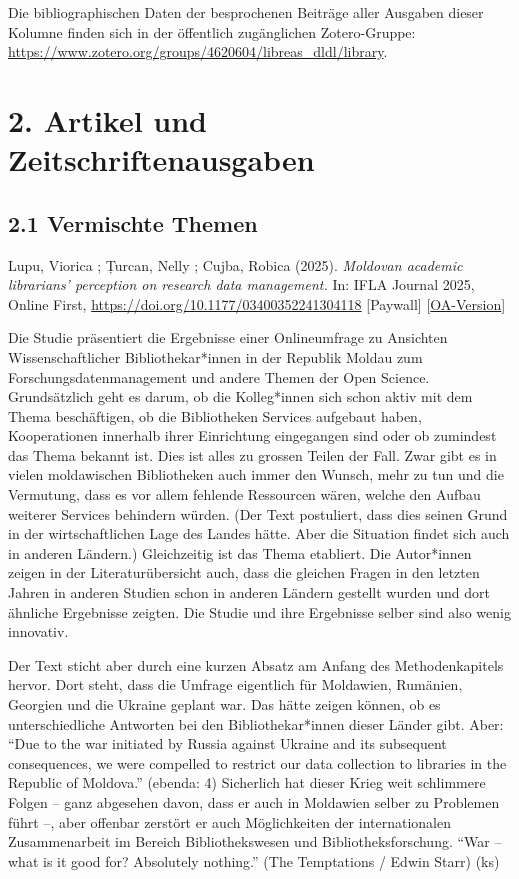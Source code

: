 \documentclass[a4paper,
fontsize=11pt,
oneside,
numbers=noperiodatend,
parskip=half-,
bibliography=totoc,
final
]{scrartcl}
\begin{document}
Die bibliographischen Daten der besprochenen Beiträge aller Ausgaben
dieser Kolumne finden sich in der öffentlich zugänglichen Zotero-Gruppe:
\url{https://www.zotero.org/groups/4620604/libreas_dldl/library}.

\section{2. Artikel und
Zeitschriftenausgaben}\label{artikel-und-zeitschriftenausgaben}

\subsection{2.1 Vermischte Themen}\label{vermischte-themen}

Lupu, Viorica ; Țurcan, Nelly ; Cujba, Robica (2025). \emph{Moldovan
academic librarians' perception on research data management.} In: IFLA
Journal 2025, Online First,
\url{https://doi.org/10.1177/03400352241304118} {[}Paywall{]}
{[}\href{http://repository.utm.md/handle/5014/29162}{OA-Version}{]}

Die Studie präsentiert die Ergebnisse einer Onlineumfrage zu Ansichten
Wissenschaftlicher Bibliothekar*innen in der Republik Moldau zum
Forschungsdatenmanagement und andere Themen der Open Science.
Grundsätzlich geht es darum, ob die Kolleg*innen sich schon aktiv mit
dem Thema beschäftigen, ob die Bibliotheken Services aufgebaut haben,
Kooperationen innerhalb ihrer Einrichtung eingegangen sind oder ob
zumindest das Thema bekannt ist. Dies ist alles zu grossen Teilen der
Fall. Zwar gibt es in vielen moldawischen Bibliotheken auch immer den
Wunsch, mehr zu tun und die Vermutung, dass es vor allem fehlende
Ressourcen wären, welche den Aufbau weiterer Services behindern würden.
(Der Text postuliert, dass dies seinen Grund in der wirtschaftlichen
Lage des Landes hätte. Aber die Situation findet sich auch in anderen
Ländern.) Gleichzeitig ist das Thema etabliert. Die Autor*innen zeigen
in der Literaturübersicht auch, dass die gleichen Fragen in den letzten
Jahren in anderen Studien schon in anderen Ländern gestellt wurden und
dort ähnliche Ergebnisse zeigten. Die Studie und ihre Ergebnisse selber
sind also wenig innovativ.

Der Text sticht aber durch eine kurzen Absatz am Anfang des
Methodenkapitels hervor. Dort steht, dass die Umfrage eigentlich für
Moldawien, Rumänien, Georgien und die Ukraine geplant war. Das hätte
zeigen können, ob es unterschiedliche Antworten bei den
Bibliothekar*innen dieser Länder gibt. Aber: \enquote{Due to the war
initiated by Russia against Ukraine and its subsequent consequences, we
were compelled to restrict our data collection to libraries in the
Republic of Moldova.} (ebenda: 4) Sicherlich hat dieser Krieg weit
schlimmere Folgen -- ganz abgesehen davon, dass er auch in Moldawien
selber zu Problemen führt --, aber offenbar zerstört er auch
Möglichkeiten der internationalen Zusammenarbeit im Bereich
Bibliothekswesen und Bibliotheksforschung. \enquote{War -- what is it
good for? Absolutely nothing.} (The Temptations / Edwin Starr) (ks)
\end{document}
